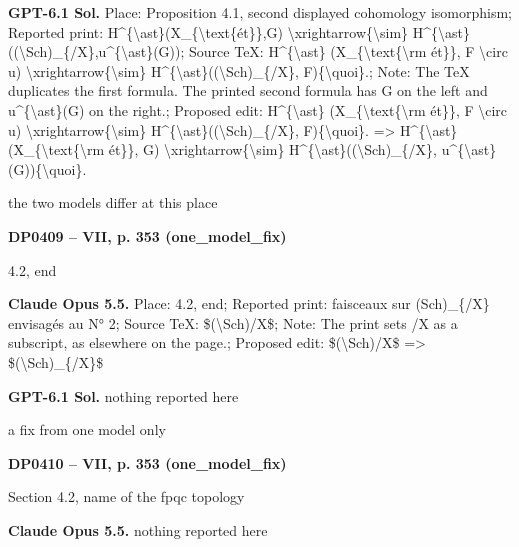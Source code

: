 \textbf{GPT-6.1 Sol.} Place: Proposition 4.1, second displayed cohomology isomorphism; Reported print: H\textasciicircum{}\{\textbackslash{}ast\}(X\_\{\textbackslash{}text\{ét\}\},G) \textbackslash{}xrightarrow\{\textbackslash{}sim\} H\textasciicircum{}\{\textbackslash{}ast\}((\textbackslash{}Sch)\_\{/X\},u\textasciicircum{}\{\textbackslash{}ast\}(G)); Source TeX: H\textasciicircum{}\{\textbackslash{}ast\} (X\_\{\textbackslash{}text\{\textbackslash{}rm ét\}\}, F \textbackslash{}circ u) \textbackslash{}xrightarrow\{\textbackslash{}sim\} H\textasciicircum{}\{\textbackslash{}ast\}((\textbackslash{}Sch)\_\{/X\}, F)\{\textbackslash{}quoi\}.; Note: The TeX duplicates the first formula. The printed second formula has G on the left and u\textasciicircum{}\{\textbackslash{}ast\}(G) on the right.; Proposed edit: H\textasciicircum{}\{\textbackslash{}ast\} (X\_\{\textbackslash{}text\{\textbackslash{}rm ét\}\}, F \textbackslash{}circ u) \textbackslash{}xrightarrow\{\textbackslash{}sim\} H\textasciicircum{}\{\textbackslash{}ast\}((\textbackslash{}Sch)\_\{/X\}, F)\{\textbackslash{}quoi\}. =\allowbreak > H\textasciicircum{}\{\textbackslash{}ast\} (X\_\{\textbackslash{}text\{\textbackslash{}rm ét\}\}, G) \textbackslash{}xrightarrow\{\textbackslash{}sim\} H\textasciicircum{}\{\textbackslash{}ast\}((\textbackslash{}Sch)\_\{/X\}, u\textasciicircum{}\{\textbackslash{}ast\} (G))\{\textbackslash{}quoi\}.\par
the two models differ at this place\par
\par\noindent\hypertarget{DP0409}{}\textbf{DP0409 -- VII, p. 353 (one\_model\_fix)}\par
4.2, end\par
\textbf{Claude Opus 5.5.} Place: 4.2, end; Reported print: faisceaux sur (Sch)\_\{/X\} envisagés au N° 2; Source TeX: \$(\textbackslash{}Sch)/X\$; Note: The print sets /X as a subscript, as elsewhere on the page.; Proposed edit: \$(\textbackslash{}Sch)/X\$ =\allowbreak > \$(\textbackslash{}Sch)\_\{/X\}\$\par
\textbf{GPT-6.1 Sol.} nothing reported here\par
a fix from one model only\par
\par\noindent\hypertarget{DP0410}{}\textbf{DP0410 -- VII, p. 353 (one\_model\_fix)}\par
Section 4.2, name of the fpqc topology\par
\textbf{Claude Opus 5.5.} nothing reported here\par
